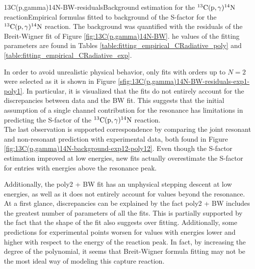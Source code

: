 \documentclass[openany]{book}
\begin{document}
{13C(p,gamma)14N-BW-residuals}{Background estimation for the $\mathrm{{}^{13}C(p, \gamma){}^{14}N}$ reaction}{Empirical formulas fitted to background of the S-factor for the $\mathrm{{}^{13}C(p, \gamma){}^{14}N}$ reaction. The background was quantified with the residuals of the Breit-Wigner fit of Figure \ref{fig:13C(p,gamma)14N-BW}. he values of the fitting parameters are found in Tables \ref{table:fitting_empirical_CRadiative_poly} and \ref{table:fitting_empirical_CRadiative_exp}.}

In order to avoid unrealistic physical behavior, only fits with orders up to $N = 2$ were selected as it is shown in Figure \ref{sfig:13C(p,gamma)14N-BW-residuals-exp1-poly1}. In particular, it is visualized that the fits do not entirely account for the discrepancies between data and the BW fit. This suggests that the initial assumption of a single channel contribution for the resonance has limitations in predicting the S-factor of the $\mathrm{{}^{13}C(p, \gamma){}^{14}N}$ reaction. \\

The last observation is supported correspondence by comparing the joint resonant and non-resonant prediction with experimental data, both found in Figure \ref{fig:13C(p,gamma)14N-background-exp12-poly12}. Even though the S-factor estimation improved at low energies, new fits actually overestimate the  S-factor for entries with energies above the resonance peak. 


Additionally, the poly2 + BW fit has an unphysical stepping descent at low energies, as well as it does not entirely account for values beyond the resonance. At a first glance, discrepancies can be explained by the fact poly2 + BW includes the greatest number of parameters of all the fits. This is partially supported by the fact that the shape of the fit also suggests over fitting. Additionally, some predictions for experimental points worsen for values with energies lower and higher with respect to the energy of the reaction peak.  In fact, by increasing the degree of the polynomial, it seems that Breit-Wigner formula fitting may not be the most ideal way of modeling this capture reaction. \\ 
\end{document}
